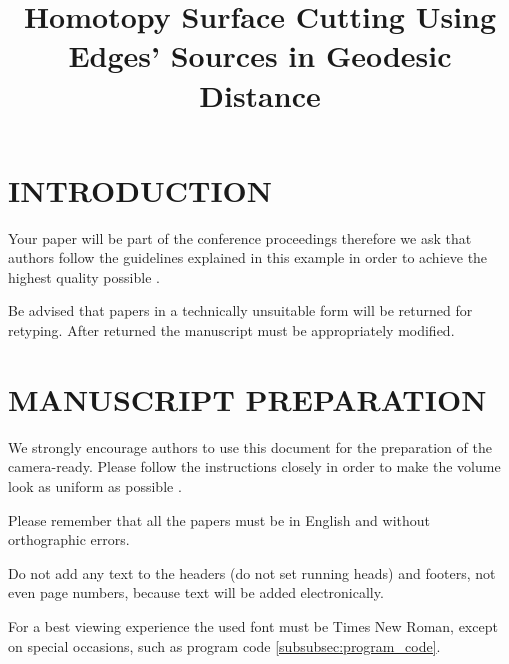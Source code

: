 \documentclass[a4paper,twoside]{article}
\begin{document}
\title{Homotopy Surface Cutting Using Edges' Sources in Geodesic Distance}

\author{
}



\onecolumn \maketitle \normalsize \vfill

\section{\uppercase{Introduction}}
\label{sec:introduction}

\noindent Your paper will be part of the conference proceedings
therefore we ask that authors follow the guidelines explained in
this example in order to achieve the highest quality possible
\cite{Smith98}.

Be advised that papers in a technically unsuitable form will be
returned for retyping. After returned the manuscript must be
appropriately modified.

\section{\uppercase{Manuscript Preparation}}

\noindent We strongly encourage authors to use this document for the
preparation of the camera-ready. Please follow the instructions
closely in order to make the volume look as uniform as possible
\cite{Moore99}.

Please remember that all the papers must be in English and without
orthographic errors.

Do not add any text to the headers (do not set running heads) and
footers, not even page numbers, because text will be added
electronically.

For a best viewing experience the used font must be Times New
Roman, except on special occasions, such as program code
\ref{subsubsec:program_code}.
\end{document}
